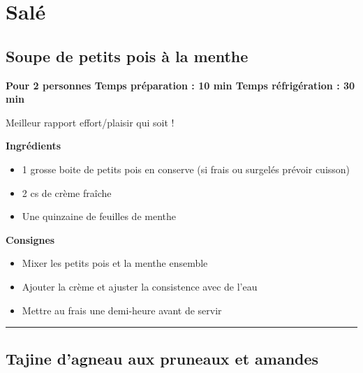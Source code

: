 \documentclass[]{book}
\providecommand{\tightlist}{%
  \setlength{\itemsep}{0pt}\setlength{\parskip}{0pt}}
\begin{document}
\hypertarget{saluxe9-1}{%
\section*{Salé}\label{saluxe9-1}}

\hypertarget{soupe-de-petits-pois-uxe0-la-menthe}{%
\subsection*{\texorpdfstring{{Soupe de petits pois à la menthe}}{Soupe de petits pois à la menthe}}\label{soupe-de-petits-pois-uxe0-la-menthe}}

\begin{salebox}
\textbf{Pour 2 personnes \textbar{} Temps préparation : 10 min
\textbar{} Temps réfrigération : 30 min}

Meilleur rapport effort/plaisir qui soit !
\end{salebox}

\textbf{Ingrédients}

\begin{itemize}
\tightlist
\item
  1 grosse boite de petits pois en conserve (si frais ou surgelés prévoir cuisson)
\item
  2 cs de crème fraîche
\item
  Une quinzaine de feuilles de menthe
\end{itemize}

\textbf{Consignes}

\begin{itemize}
\tightlist
\item
  Mixer les petits pois et la menthe ensemble
\item
  Ajouter la crème et ajuster la consistence avec de l'eau
\item
  Mettre au frais une demi-heure avant de servir
\end{itemize}

\begin{center}\rule{0.5\linewidth}{0.5pt}\end{center}

\hypertarget{tajine-dagneau-aux-pruneaux-et-amandes}{%
\subsection*{\texorpdfstring{{Tajine d'agneau aux pruneaux et amandes}}{Tajine d'agneau aux pruneaux et amandes}}\label{tajine-dagneau-aux-pruneaux-et-amandes}}
\end{document}

